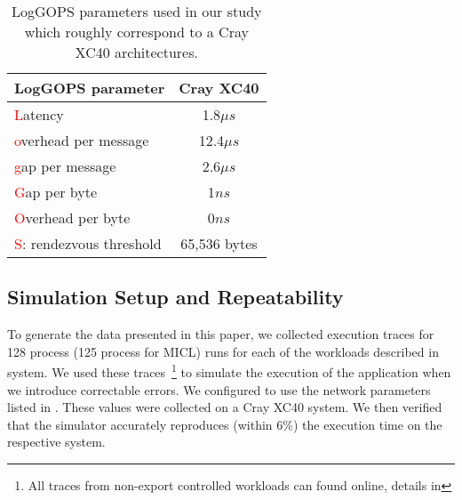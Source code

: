 \begin{table}
\centering
\begin{tabular}{ l c }
\toprule
LogGOPS parameter & Cray XC40 \\
\midrule
\textcolor{red}{L}atency                & 1.8$\mu s$ \\
\textcolor{red}{o}verhead per message   & 12.4$\mu s$ \\
\textcolor{red}{g}ap per message        & 2.6$\mu s$  \\
\textcolor{red}{G}ap per byte           & 1$ns$     \\
\textcolor{red}{O}verhead per byte      & 0$ns$     \\
\textcolor{red}{S}: rendezvous threshold& 65,536 bytes \\
\bottomrule
\end{tabular}
\vspace{.6em}
\caption{
  LogGOPS parameters used in our study which roughly correspond to a Cray
  XC40 architectures.
}
\label{tab:logp}
\end{table}

\subsection{Simulation Setup and Repeatability}

To generate the data presented in this paper, we collected execution traces for
128 process (125 process for MICL) runs for each of the workloads described in 
 system.  We used these traces~\footnote{All traces from non-export
controlled workloads can found online, details in } to simulate
the execution of the application when we introduce correctable errors.  We configured 
\LogGOPSim to use the network parameters listed in .  These values 
were collected on a Cray XC40 system.    We then verified that the simulator accurately 
reproduces (within 6\%) the execution time on the respective system.

